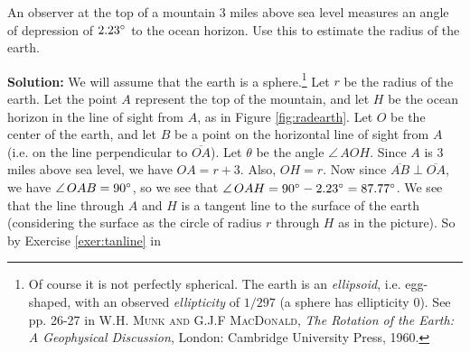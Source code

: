\begin{exmp}\label{exmp:radearth}
 An observer at the top of a mountain $3$ miles above sea level measures an angle of depression of
 $2.23^\circ$ to the ocean horizon. Use this to estimate the radius of the earth.
\piccaption[]{\label{fig:radearth}}
 \par\noindent\textbf{Solution:} We will assume that the earth is a sphere.\footnote{Of course it is
 not perfectly spherical. The earth is an \emph{ellipsoid}, i.e. egg-shaped, with
 an observed \emph{ellipticity} of $1/297$ (a sphere has ellipticity $0$). See
 pp. 26-27 in \textsc{W.H. Munk and G.J.F MacDonald}, \emph{The Rotation of the Earth: A Geophysical
 Discussion}, London: Cambridge University Press, 1960.} Let $r$ be the radius of the earth. Let
 the point $A$ represent the top of the mountain, and let $H$ be the ocean horizon in the line of
 sight from $A$, as in Figure \ref{fig:radearth}. Let $O$ be the center of the earth, and let $B$ be
 a point on the horizontal line of sight from $A$ (i.e. on the line perpendicular to
 $\overline{OA}$). Let $\theta$ be the angle $\angle\,AOH$.
 Since $A$ is $3$ miles above sea level, we have $OA = r + 3$. Also, $OH = r$. Now since
 $\overline{AB} \perp \overline{OA}$, we have $\angle\,OAB = 90^\circ$, so we see that
 $\angle\,OAH = 90^\circ - 2.23^\circ = 87.77^\circ$. We see that the line through
 $A$ and $H$ is a tangent line to the surface of the earth (considering the surface as the circle of
 radius $r$ through $H$ as in the picture). So by Exercise \ref{exer:tanline} in

\end{exmp}
